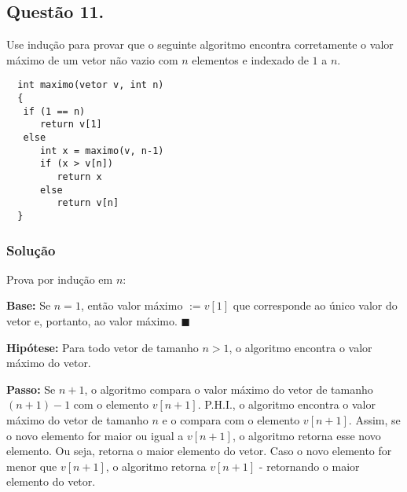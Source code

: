 \documentclass[12pt, letterpaper]{report}
\newcommand*{\CQD}{\hfill\ensuremath{\blacksquare}}%
\newcounter{ProblemNum}
\newcommand*{\anyproblem}[1]{\newpage\subsection*{#1}}
\newcommand*{\problem}[1]{\stepcounter{ProblemNum} %
   \anyproblem{Questão #1}}
\newcommand*{\soln}[1]{\subsubsection*{#1}}
\newcommand*{\solution}{\soln{Solução}}
\begin{document}
\problem{11.}
    Use indução para provar que o seguinte algoritmo encontra corretamente o valor máximo de um vetor não vazio com $ n $ elementos e indexado de $ 1 $ a $ n $.

\begin{lstlisting}
  int maximo(vetor v, int n) 
  {
   if (1 == n)
      return v[1]
   else
      int x = maximo(v, n-1)
      if (x > v[n])
         return x
      else
         return v[n]
  }
\end{lstlisting}

\solution
  Prova por indução em $n$:

  \textbf{Base:} Se $n = 1$, então valor máximo $:= v[1]$ que corresponde ao único valor do vetor e, portanto, ao valor máximo. \CQD

  \textbf{Hipótese:} Para todo vetor de tamanho $n > 1$, o algoritmo encontra o valor máximo do vetor.

  \textbf{Passo:} Se $n + 1$, o algoritmo compara o valor máximo do vetor de tamanho $(n + 1) - 1$ com o elemento $v[n + 1]$. 
  P.H.I., o algoritmo encontra o valor máximo do vetor de tamanho $n$ e o compara com o elemento $v[n + 1]$.
  Assim, se o novo elemento for maior ou igual a $v[n + 1]$, o algoritmo retorna esse novo elemento. Ou seja, retorna o maior elemento do vetor.
  Caso o novo elemento for menor que $v[n +1]$, o algoritmo retorna $v[n + 1]$ - retornando o maior elemento do vetor.
\end{document}
